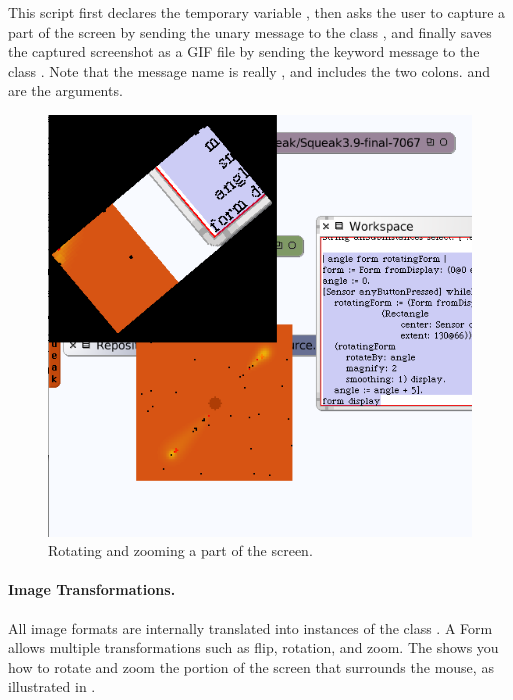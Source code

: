 \documentclass[a4paper,10pt,twoside]{book}
\begin{document}
\noindent
This script first declares the temporary variable , then asks the user to capture a part of the screen by sending the unary message  to the class , and finally saves the captured screenshot as a GIF file by sending the keyword message  to the class . Note that the message name is really , 
and includes the two colons.  and  are the arguments.

\begin{figure}
\begin{center}\includegraphics[scale=0.7]{rotated}\end{center}
\caption{Rotating and zooming a part of the screen.}
\end{figure}

\paragraph{Image Transformations.}
All image formats are internally translated into instances of the class . A Form allows multiple transformations such as flip, rotation, and zoom. The  shows you how to rotate and zoom 
the portion of the screen that surrounds the mouse, as illustrated in .
\end{document}

